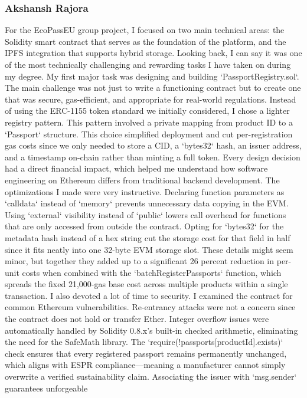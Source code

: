 \documentclass[runningheads]{llncs}
\begin{document}
	\subsubsection{Akshansh Rajora}
	For the EcoPassEU group project, I focused on two main technical areas: the Solidity smart contract that serves as the foundation of the platform, and the
	IPFS integration that supports hybrid storage. Looking back, I can say it was one of the most technically challenging and rewarding tasks I have taken on
	during my degree. My first major task was designing and building `PassportRegistry.sol`. The main challenge was not just to write a functioning contract but
	to create one that was secure, gas-efficient, and appropriate for real-world regulations. Instead of using the ERC-1155 token standard we initially
	considered, I chose a lighter registry pattern. This pattern involved a private mapping from product ID to a `Passport` structure. This choice simplified
	deployment and cut per-registration gas costs since we only needed to store a CID, a `bytes32` hash, an issuer address, and a timestamp on-chain rather than
	minting a full token. Every design decision had a direct financial impact, which helped me understand how software engineering on Ethereum differs from
	traditional backend development. The optimizations I made were very instructive. Declaring function parameters as `calldata` instead of `memory` prevents
	unnecessary data copying in the EVM. Using `external` visibility instead of `public` lowers call overhead for functions that are only accessed from outside the
	contract. Opting for `bytes32` for the metadata hash instead of a hex string cut the storage cost for that field in half since it fits neatly into one 32-byte
	EVM storage slot. These details might seem minor, but together they added up to a significant 26 percent reduction in per-unit costs when combined with the
	`batchRegisterPassports` function, which spreads the fixed 21,000-gas base cost across multiple products within a single transaction. I also devoted a lot of
	time to security. I examined the contract for common Ethereum vulnerabilities. Re-entrancy attacks were not a concern since the contract does not hold or
	transfer Ether. Integer overflow issues were automatically handled by Solidity 0.8.x's built-in checked arithmetic, eliminating the need for the SafeMath
	library. The `require(!passports[productId].exists)` check ensures that every registered passport remains permanently unchanged, which aligns with ESPR
	compliance—meaning a manufacturer cannot simply overwrite a verified sustainability claim. Associating the issuer with `msg.sender` guarantees unforgeable
\end{document}
